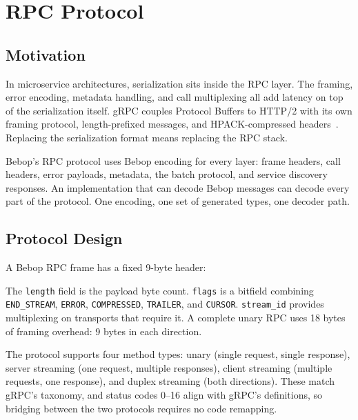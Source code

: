 \documentclass[10pt,onecolumn]{article}
\newcommand{\wirefield}[3]{%
    \draw[fill=lightgray,draw=bebopgray!50] (#1,0) rectangle (#2,0.5);
    \node[font=\ttfamily\footnotesize] at ({(#1+#2)/2},0.25) {#3};
}
\newcommand{\wirelabel}[3]{%
    \node[font=\sffamily\scriptsize,below] at ({(#1+#2)/2},-0.08) {#3};
}
\begin{document}
\newpage
\section{RPC Protocol}

\subsection{Motivation}

In microservice architectures, serialization sits inside the RPC layer. The framing, error encoding, metadata handling, and call multiplexing all add latency on top of the serialization itself. gRPC couples Protocol Buffers to HTTP/2 with its own framing protocol, length-prefixed messages, and HPACK-compressed headers~\cite{grpc-http2-spec}. Replacing the serialization format means replacing the RPC stack.

Bebop's RPC protocol uses Bebop encoding for every layer: frame headers, call headers, error payloads, metadata, the batch protocol, and service discovery responses. An implementation that can decode Bebop messages can decode every part of the protocol. One encoding, one set of generated types, one decoder path.

\subsection{Protocol Design}

A Bebop RPC frame has a fixed 9-byte header:

\vspace{4pt}
\begin{center}
\end{center}
\vspace{4pt}

\noindent The \texttt{length} field is the payload byte count. \texttt{flags} is a bitfield combining \texttt{END\_STREAM}, \texttt{ERROR}, \texttt{COMPRESSED}, \texttt{TRAILER}, and \texttt{CURSOR}. \texttt{stream\_id} provides multiplexing on transports that require it. A complete unary RPC uses 18 bytes of framing overhead: 9 bytes in each direction.

The protocol supports four method types: unary (single request, single response), server streaming (one request, multiple responses), client streaming (multiple requests, one response), and duplex streaming (both directions). These match gRPC's taxonomy, and status codes 0--16 align with gRPC's definitions, so bridging between the two protocols requires no code remapping.
\end{document}
